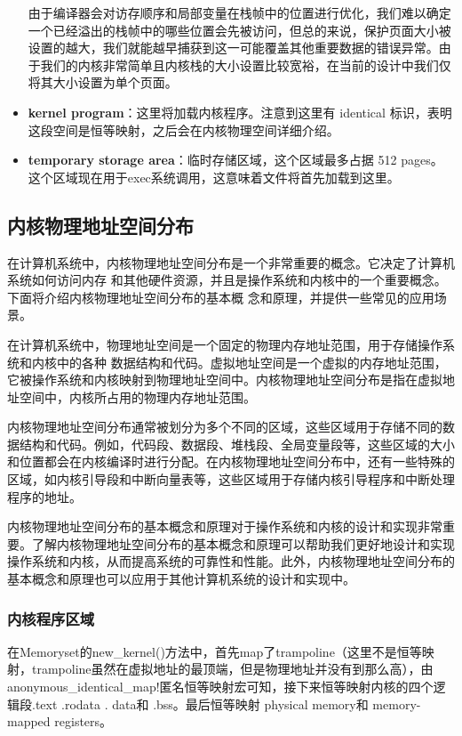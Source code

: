 \begin{itemize}
	由于编译器会对访存顺序和局部变量在栈帧中的位置进行优化，我们难以确定一个已经溢出的栈帧中的哪些位置会先被访问，但总的来说，保护页面大小被设置的越大，我们就能越早捕获到这一可能覆盖其他重要数据的错误异常。由于我们的内核非常简单且内核栈的大小设置比较宽裕，在当前的设计中我们仅将其大小设置为单个页面。
	\item \textbf{kernel program}：这里将加载内核程序。注意到这里有 identical 标识，表明这段空间是恒等映射，之后会在内核物理空间详细介绍。
	\item \textbf{temporary storage area}：临时存储区域，这个区域最多占据 512 pages。这个区域现在用于exec系统调用，这意味着文件将首先加载到这里。
\end{itemize}

\subsection{内核物理地址空间分布}

在计算机系统中，内核物理地址空间分布是一个非常重要的概念。它决定了计算机系统如何访问内存
和其他硬件资源，并且是操作系统和内核中的一个重要概念。下面将介绍内核物理地址空间分布的基本概
念和原理，并提供一些常见的应用场景。

在计算机系统中，物理地址空间是一个固定的物理内存地址范围，用于存储操作系统和内核中的各种
数据结构和代码。虚拟地址空间是一个虚拟的内存地址范围，它被操作系统和内核映射到物理地址空间中。内核物理地址空间分布是指在虚拟地址空间中，内核所占用的物理内存地址范围。

内核物理地址空间分布通常被划分为多个不同的区域，这些区域用于存储不同的数据结构和代码。例如，代码段、数据段、堆栈段、全局变量段等，这些区域的大小和位置都会在内核编译时进行分配。在内核物理地址空间分布中，还有一些特殊的区域，如内核引导段和中断向量表等，这些区域用于存储内核引导程序和中断处理程序的地址。

内核物理地址空间分布的基本概念和原理对于操作系统和内核的设计和实现⾮常重要。了解内核物理地址空间分布的基本概念和原理可以帮助我们更好地设计和实现操作系统和内核，从而提高系统的可靠性和性能。此外，内核物理地址空间分布的基本概念和原理也可以应用于其他计算机系统的设计和实现中。

\subsubsection{内核程序区域}

在Memoryset的new\_kernel()方法中，首先map了trampoline（这里不是恒等映射，trampoline虽然在虚拟地址的最顶端，但是物理地址并没有到那么高），由anonymous\_identical\_map!匿名恒等映射宏可知，接下来恒等映射内核的四个逻辑段.text .rodata . data和 .bss。最后恒等映射 physical memory和 memory-mapped registers。

